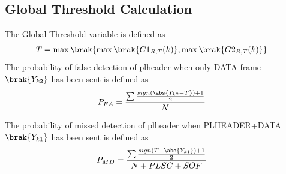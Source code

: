 \documentclass[journal,12pt,twocolumn]{IEEEtran}
\begin{document}
\subsection{Global Threshold Calculation}
The Global Threshold variable is defined as
\begin{align}
T&= \max \brak{ \max \brak{G1_{R,T}(k)},\max \brak{ G2_{R,T}(k)}}
\end{align} 
The probability of false detection of plheader when only DATA frame $\brak{Y_{k2}}$ has been sent is defined as
\begin{align}
P_{FA} &= \frac{\sum \frac{sign(\abs{Y_{k2}-T})+1}{2} }{N}
\end{align}

The probability of missed detection of plheader when PLHEADER+DATA $\brak{Y_{k1}}$ has been sent is defined as
\begin{align}
P_{MD} &= \frac{\sum \frac{sign(T-\abs{Y_{k1}})+1}{2} }{N+PLSC+SOF}
\end{align}
\end{document}
